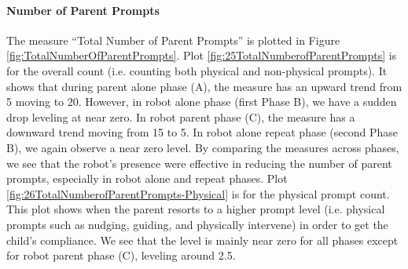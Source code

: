 \paragraph{Number of Parent Prompts}
The measure ``Total Number of Parent Prompts'' is plotted in Figure \ref{fig:TotalNumberOfParentPrompts}.  Plot \ref{fig:25TotalNumberofParentPrompts} is for the overall count (i.e. counting both physical and non-physical prompts).  It shows that during parent alone phase (A), the measure has an upward trend from 5 moving to 20.  However, in robot alone phase (first Phase B), we have a sudden drop leveling at near zero.  In robot parent phase (C), the measure has a downward trend moving from 15 to 5.  In robot alone repeat phase (second Phase B), we again observe a near zero level.  By comparing the measures across phases, we see that the robot's presence were effective in reducing the number of parent prompts, especially in robot alone and repeat phases.  Plot \ref{fig:26TotalNumberofParentPrompts-Physical} is for the physical prompt count.  This plot shows when the parent resorts to a higher prompt level (i.e. physical prompts such as nudging, guiding, and physically intervene) in order to get the child's compliance.  We see that the level is mainly near zero for all phases except for robot parent phase (C), leveling around 2.5.
